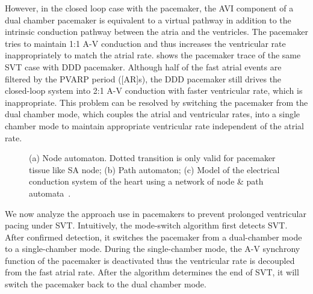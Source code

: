 However, in the closed loop case with the pacemaker, the AVI component of a dual chamber pacemaker is equivalent to a virtual pathway in addition to the intrinsic conduction pathway between the atria and the ventricles. The pacemaker tries to maintain 1:1 A-V conduction and thus increases the ventricular rate inappropriately to match the atrial rate.  shows the pacemaker trace of the same SVT case with DDD pacemaker. Although half of the fast atrial events are filtered by the PVARP period ([AR]s), the DDD pacemaker still drives the closed-loop system into 2:1 A-V conduction with faster ventricular rate, which is inappropriate. This problem can be resolved by switching the pacemaker from the dual chamber mode, which couples the atrial and ventricular rates, into a single chamber mode to maintain appropriate ventricular rate independent of the atrial rate. 
\begin{figure}[!t]
\centering
		
\caption{\small (a) Node automaton. Dotted transition is only valid for pacemaker tissue like SA node; (b) Path automaton; (c) Model of the electrical conduction system of the heart using a network of node \& path automata~\cite{vhm_ecrts10}.}
\end{figure} 

We now analyze the approach use in pacemakers to prevent prolonged ventricular pacing under SVT. Intuitively, the mode-switch algorithm first detects SVT. After confirmed detection, it switches the pacemaker from a dual-chamber mode to a single-chamber mode. During the single-chamber mode, the A-V synchrony function of the pacemaker is deactivated thus the ventricular rate is decoupled from the fast atrial rate. After the algorithm determines the end of SVT, it will switch the pacemaker back to the dual chamber mode. 


